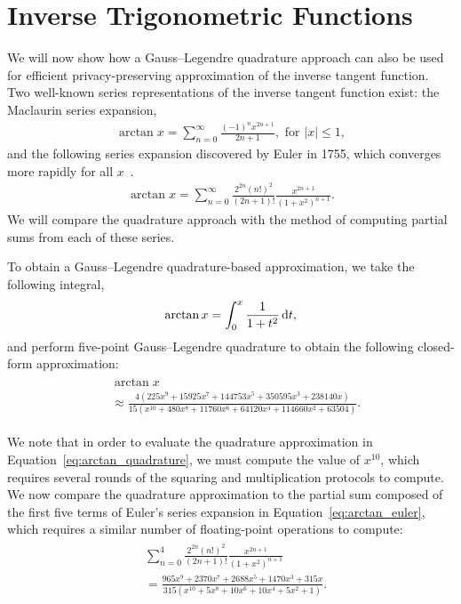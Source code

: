 \section{Inverse Trigonometric Functions}
We will now show how a Gauss--Legendre quadrature approach can also be used for efficient privacy-preserving approximation of the inverse tangent function. Two well-known series representations of the inverse tangent function exist: the Maclaurin series expansion,
\begin{align} \label{eq:arctan_maclaurin}
	\arctan x = \sum_{n=0}^{\infty}{\frac{(-1)^nx^{2n+1}}{2n+1}}, \text{ for }|x|\leq 1,
\end{align}
and the following series expansion discovered by Euler in 1755, which converges more rapidly for all $x$~\cite{chien-lih_89.67_2005}.
\begin{align} \label{eq:arctan_euler}
	\arctan x = \sum_{n=0}^{\infty}
	{
	\frac
		{2^{2n}(n!)^2}
		{(2n+1)!}
	\frac
		{x^{2n+1}}
		{(1+x^2)^{n+1}}
	}.
\end{align}
We will compare the quadrature approach with the method of computing partial sums from each of these series.

To obtain a Gauss--Legendre quadrature-based approximation, we take the following integral,
\begin{align*}
	\arctan x = \int_0^x{\frac{1}{1+t^2}\mathop{}\!\mathrm{d} t},
\end{align*}
and perform five-point Gauss--Legendre quadrature to obtain the following closed-form approximation:
\begin{align} \label{eq:arctan_quadrature}
	\begin{split}
		&\arctan x \\
		&\approx \frac
		{4\left(225x^9 + 15925x^7 + 144753x^5 + 350595x^3 + 238140x\right)}
		{15\left(x^{10} + 480x^8 + 11760x^6 + 64120x^4 + 114660x^2 + 63504\right)}.
	\end{split}
\end{align}

We note that in order to evaluate the quadrature approximation in Equation~\ref{eq:arctan_quadrature}, we must compute the value of $x^{10}$, which requires several rounds of the squaring and multiplication protocols to compute. We now compare the quadrature approximation to the partial sum composed of the first five terms of Euler's series expansion in Equation~\ref{eq:arctan_euler}, which requires a similar number of floating-point operations to compute:
\begin{align} \label{eq:arctan_euler_partial}
	\begin{split}
		&\sum_{n=0}^{4}
		{
		\frac
			{2^{2n}(n!)^2}
			{(2n+1)!}
		\frac
			{x^{2n+1}}
			{(1+x^2)^{n+1}}
		}\\
		&= \frac
		{965x^9 + 2370x^7 + 2688x^5 + 1470x^3 + 315x}
		{315\left(x^{10} + 5x^8 + 10x^6 + 10x^4 + 5x^2 + 1\right)}.
	\end{split}
\end{align}

